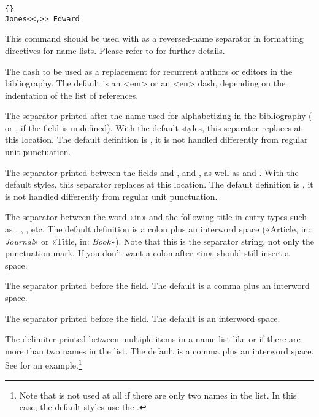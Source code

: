 \begin{ltxsyntax}
\begin{lstlisting}[style=latex]{}
Jones<<,>> Edward
\end{lstlisting}

This command should be used with  as a reversed-name separator in formatting directives for name lists. Please refer to  for further details.

The dash to be used as a replacement for recurrent authors or editors in the bibliography. The default is an <em> or an <en> dash, depending on the indentation of the list of references.

The separator printed after the name used for alphabetizing in the bibliography ( or , if the  field is undefined). With the default styles, this separator replaces  at this location. The default definition is , \ie it is not handled differently from regular unit punctuation.

The separator printed between the fields  and ,  and , as well as  and . With the default styles, this separator replaces  at this location. The default definition is , \ie it is not handled differently from regular unit punctuation.

The separator between the word «in» and the following title in entry types such as , , , etc. The default definition is a colon plus an interword space (\eg «Article, in: \emph{Journal}» or «Title, in: \emph{Book}»). Note that this is the separator string, not only the punctuation mark. If you don't want a colon after «in»,  should still insert a space.

The separator printed before the  field. The default is a comma plus an interword space.

The separator printed before the  field. The default is an interword space.

The delimiter printed between multiple items in a name list like  or  if there are more than two names in the list. The default is a comma plus an interword space. See  for an example.\footnote{Note that  is not used at all if there are only two names in the list. In this case, the default styles use the .}


\end{ltxsyntax}
